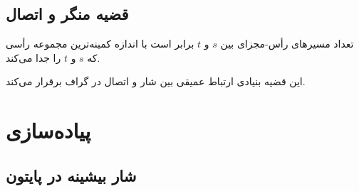 \documentclass{matinbook}
\begin{document}
    \subsection{قضیه منگر و اتصال}
    
    \begin{theorem}
        تعداد مسیرهای رأس-مجزای بین $s$ و $t$
        برابر است با اندازه کمینه‌ترین
        مجموعه رأسی که $s$ و $t$ را جدا می‌کند.
        \label{thm:menger}
    \end{theorem}
    
    این قضیه بنیادی ارتباط عمیقی بین
    شار و اتصال در گراف برقرار می‌کند.
    
    \section{پیاده‌سازی}
    
    \subsection{شار بیشینه در پایتون}
    
\end{document}
